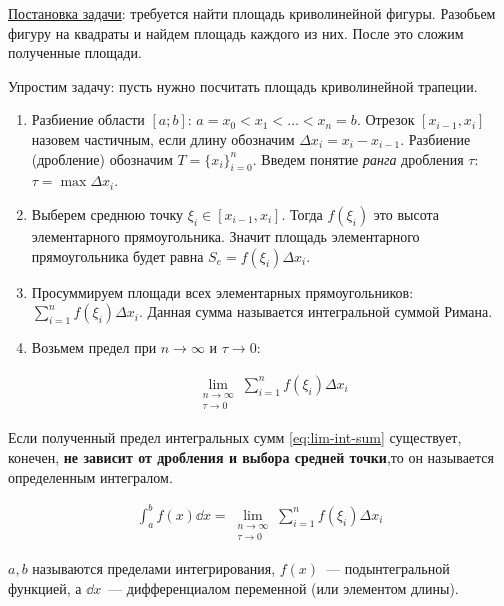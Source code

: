 
\underline{Постановка задачи}: требуется найти площадь криволинейной фигуры.
Разобьем фигуру на квадраты и найдем площадь каждого из них. После это сложим
полученные площади.



Упростим задачу: пусть нужно посчитать площадь криволинейной трапеции.

\begin{twocolumns}
  
  \columnbreak

  \begin{enumerate}
    \item Разбиение области \([a;b]\):
    \(a = x_{0} < x_{1} < \dotsc < x_{n} = b\).
    Отрезок \([x_{i - 1}, x_{i}]\) назовем частичным, если длину обозначим 
    \(\Delta x_{i} = x_{i} - x_{i - 1}\).
    Разбиение (дробление) обозначим \(T = \{ x_{i} \}_{i = 0}^{n}\). Введем
    понятие \textit{ранга} дробления \(\tau\): \(\tau = \max \Delta x_{i}\).

    \item Выберем среднюю точку \(\xi_{i} \in [x_{i - 1}, x_{i}]\). Тогда
    \(f(\xi_{i})\) это высота элементарного прямоугольника. Значит площадь
    элементарного прямоугольника будет равна
    \(S_{e} = f(\xi_{i}) \Delta x_{i}\).

    \item Просуммируем площади всех элементарных прямоугольников:
    \(\sum_{i = 1}^{n} f(\xi_{i}) \Delta x_{i}\). Данная сумма называется
    интегральной суммой Римана.

    \item Возьмем предел при \(n \to \infty\) и \(\tau \to 0\):
    
    \begin{align*}\label{eq:lim-int-sum}\tag{1}
      \lim_{\substack{n \to \infty \\ \tau \to 0}}
        \sum_{i = 1}^{n} f(\xi_{i}) \Delta x_{i}
    \end{align*}
  \end{enumerate}
\end{twocolumns}

\begin{definition}
  Если полученный предел интегральных сумм \eqref{eq:lim-int-sum} существует,
  конечен, \textbf{не зависит от дробления и выбора средней точки},то он
  называется определенным интегралом.

  \begin{align*}
    \int_{a}^{b} f(x) \dd x = \lim_{\substack{n \to \infty \\ \tau \to 0}}
      \sum_{i = 1}^{n} f(\xi_{i}) \Delta x_{i}
  \end{align*}

  \(a, b\) называются пределами интегрирования, \(f(x)\)~--- подынтегральной
  функцией, а \(\dd x\)~--- дифференциалом переменной (или элементом длины).
\end{definition}

